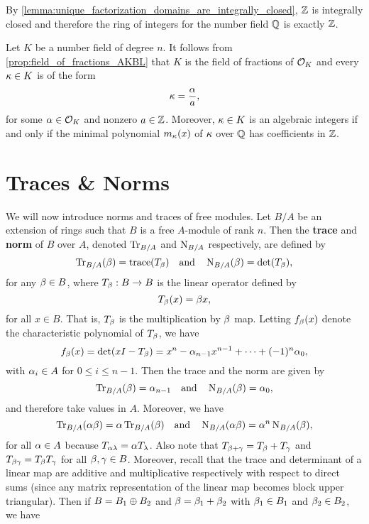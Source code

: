     \begin{remark}\label{rem:integers_are_integrally_closed}
      By \cref{lemma:unique_factorization_domains_are_integrally_closed}, $\mathbb{Z}$ is integrally closed and therefore the ring of integers for the number field $\mathbb{Q}$ is exactly $\mathbb{Z}$.
    \end{remark}

    Let $K$ be a number field of degree $n$. It follows from \cref{prop:field_of_fractions_AKBL} that $K$ is the field of fractions of $\mathcal{O}_{K}$ and every $\kappa \in K$ is of the form
    \[
      \kappa = \frac{\alpha}{a},
    \]
    for some $\alpha \in \mathcal{O}_{K}$ and nonzero $a \in \mathbb{Z}$. Moreover, $\kappa \in K$ is an algebraic integers if and only if the minimal polynomial $m_{\kappa}(x)$ of $\kappa$ over $\mathbb{Q}$ has coefficients in $\mathbb{Z}$.
  \section{Traces \& Norms}
    We will now introduce norms and traces of free modules. Let $B/A$ be an extension of rings such that $B$ is a free $A$-module of rank $n$. Then the \textbf{trace} and \textbf{norm} of $B$ over $A$, denoted $\operatorname{\mathrm{Tr}}_{B/A}$ and $\operatorname{\mathrm{N}}_{B/A}$ respectively, are defined by
    \[
      \operatorname{\mathrm{Tr}}_{B/A}(\beta) = \operatorname{\mathrm{trace}}(T_{\beta}) \quad \text{and} \quad \operatorname{\mathrm{N}}_{B/A}(\beta) = \det(T_{\beta}),
    \]
    for any $\beta \in B$, where $T_{\beta}:B \to B$ is the linear operator defined by
    \[
      T_{\beta}(x) = \beta x,
    \]
    for all $x \in B$. That is, $T_{\beta}$ is the multiplication by $\beta$ map. Letting $f_{\beta}(x)$ denote the characteristic polynomial of $T_{\beta}$, we have
    \[
      f_{\beta}(x) = \det(xI-T_{\beta}) = x^{n}-\alpha_{n-1}x^{n-1}+\cdots+(-1)^{n}\alpha_{0},
    \]
    with $\alpha_{i} \in A$ for $0 \le i \le n-1$. Then the trace and the norm are given by
    \begin{equation}\label{equ:trace_and_norm_characteristic_polynomial}
      \operatorname{\mathrm{Tr}}_{B/A}(\beta) = \alpha_{n-1} \quad \text{and} \quad \operatorname{\mathrm{N}}_{B/A}(\beta) = \alpha_{0},
    \end{equation}
    and therefore take values in $A$. Moreover, we have
    \[
      \operatorname{\mathrm{Tr}}_{B/A}(\alpha\beta) = \alpha\operatorname{\mathrm{Tr}}_{B/A}(\beta) \quad \text{and} \quad \operatorname{\mathrm{N}}_{B/A}(\alpha\beta) = \alpha^{n}\operatorname{\mathrm{N}}_{B/A}(\beta),
    \]
    for all $\alpha \in A$ because $T_{\alpha\lambda} = \alpha T_{\lambda}$. Also note that $T_{\beta+\gamma} = T_{\beta}+T_{\gamma}$ and $T_{\beta\gamma} = T_{\beta}T_{\gamma}$ for all $\beta,\gamma \in B$. Moreover, recall that the trace and determinant of a linear map are additive and multiplicative respectively with respect to direct sums (since any matrix representation of the linear map becomes block upper triangular). Then if $B = B_{1} \oplus B_{2}$ and $\beta = \beta_{1}+\beta_{2}$ with $\beta_{1} \in B_{1}$ and $\beta_{2} \in B_{2}$, we have
